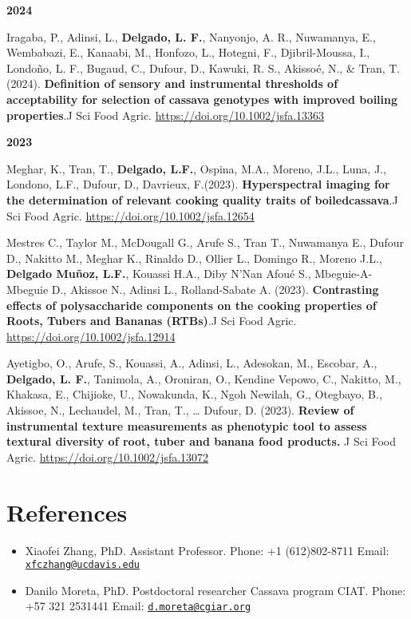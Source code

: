 \documentclass[11pt,a4paper,]{awesome-cv}
\begin{document}
\footnotesize

\setlength{\leftskip}{0cm}

\textbf{2024}

\setlength{\leftskip}{1cm}

Iragaba, P., Adinsi, L., \textbf{Delgado, L. F.}, Nanyonjo, A. R.,
Nuwamanya, E., Wembabazi, E., Kanaabi, M., Honfozo, L., Hotegni, F.,
Djibril-Moussa, I., Londoño, L. F., Bugaud, C., Dufour, D., Kawuki, R.
S., Akissoé, N., \& Tran, T.(2024). \textbf{Definition of sensory and
instrumental thresholds of acceptability for selection of cassava
genotypes with improved boiling properties}.J Sci Food Agric.
\url{https://doi.org/10.1002/jsfa.13363}

\setlength{\leftskip}{0cm}

\textbf{2023}

\setlength{\leftskip}{1cm}

Meghar, K., Tran, T., \textbf{Delgado, L.F.}, Ospina, M.A., Moreno,
J.L., Luna, J., Londono, L.F., Dufour, D., Davrieux, F.(2023).
\textbf{Hyperspectral imaging for the determination of relevant cooking
quality traits of boiledcassava}.J Sci Food Agric.
\url{https://doi.org/10.1002/jsfa.12654}

Mestres C., Taylor M., McDougall G., Arufe S., Tran T., Nuwamanya E.,
Dufour D., Nakitto M., Meghar K., Rinaldo D., Ollier L., Domingo R.,
Moreno J.L., \textbf{Delgado Muñoz, L.F.}, Kouassi H.A., Diby N'Nan
Afoué S., Mbeguie-A-Mbeguie D., Akissoe N., Adinsi L., Rolland-Sabate A.
(2023). \textbf{Contrasting effects of polysaccharide components on the
cooking properties of Roots, Tubers and Bananas (RTBs)}.J Sci Food
Agric. \url{https://doi.org/10.1002/jsfa.12914}

Ayetigbo, O., Arufe, S., Kouassi, A., Adinsi, L., Adesokan, M., Escobar,
A., \textbf{Delgado, L. F.}, Tanimola, A., Oroniran, O., Kendine Vepowo,
C., Nakitto, M., Khakasa, E., Chijioke, U., Nowakunda, K., Ngoh Newilah,
G., Otegbayo, B., Akissoe, N., Lechaudel, M., Tran, T., \ldots{} Dufour,
D. (2023). \textbf{Review of instrumental texture measurements as
phenotypic tool to assess textural diversity of root, tuber and banana
food products.} J Sci Food Agric.
\url{https://doi.org/10.1002/jsfa.13072}

\hypertarget{references}{%
\section{References}\label{references}}

\begin{itemize}
\item
  Xiaofei Zhang, PhD. Assistant Professor. Phone: +1 (612)802-8711
  Email:
  \href{mailto:xfczhang@ucdavis.edu}{\nolinkurl{xfczhang@ucdavis.edu}}
\item
  Danilo Moreta, PhD. Postdoctoral researcher Cassava program CIAT.
  Phone: +57 321 2531441 Email:
  \href{mailto:d.moreta@cgiar.org}{\nolinkurl{d.moreta@cgiar.org}}
\end{itemize}


\label{LastPage}~
\end{document}
